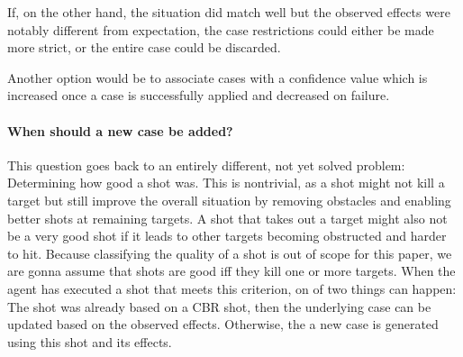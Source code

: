 If, on the other hand, the situation did match well but the observed effects were notably different from expectation, the case restrictions could either be made more strict, or the entire case could be discarded.

Another option would be to associate cases with a confidence value which is increased once a case is successfully applied and decreased on failure.



\paragraph{When should a new case be added?}
This question goes back to an entirely different, not yet solved problem: Determining how good a shot was.
This is nontrivial, as a shot might not kill a target but still improve the overall situation by removing obstacles and enabling better shots at remaining targets.
A shot that takes out a target might also not be a very good shot if it leads to other targets becoming obstructed and harder to hit.
Because classifying the quality of a shot is out of scope for this paper, we are gonna assume that shots are good iff they kill one or more targets.
When the agent has executed a shot that meets this criterion, on of two things can happen: The shot was already based on a CBR shot, then the underlying case can be updated based on the observed effects. Otherwise, the a new case is generated using this shot and its effects.